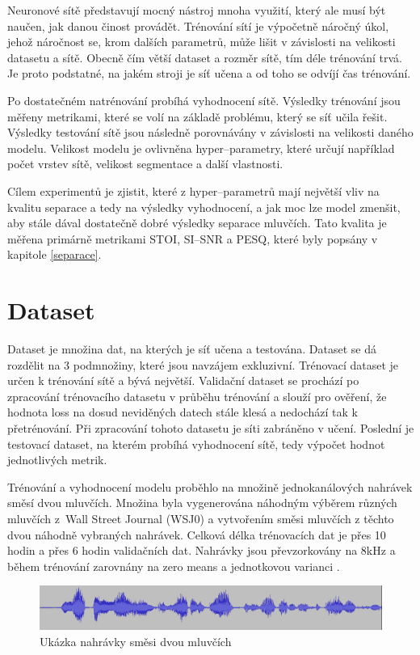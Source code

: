 Neuronové sítě představují mocný nástroj mnoha využití, který ale musí být naučen, jak danou činost provádět. Trénování sítí je výpočetně náročný úkol, jehož náročnost se, krom dalších parametrů, může lišit v závislosti na velikosti datasetu a sítě. Obecně čím větší dataset a rozměr sítě, tím déle trénování trvá. Je proto podstatné, na jakém stroji je síť učena a od toho se odvíjí čas trénování.

Po dostatečném natrénování probíhá vyhodnocení sítě. Výsledky trénování jsou měřeny metrikami, které se volí na základě problému, který se síť učila řešit. Výsledky testování sítě jsou následně porovnávány v závislosti na velikosti daného modelu. Velikost modelu je ovlivněna hyper--parametry, které určují například počet vrstev sítě, velikost segmentace a další vlastnosti.

Cílem experimentů je zjistit, které z hyper--parametrů mají největší vliv na kvalitu separace a tedy na výsledky vyhodnocení, a jak moc lze model zmenšit, aby stále dával dostatečně dobré výsledky separace mluvčích. Tato kvalita je měřena primárně metrikami STOI, SI--SNR a PESQ, které byly popsány v kapitole \ref{separace}.


\section{Dataset}
Dataset je množina dat, na kterých je síť učena a testována. Dataset se dá rozdělit na 3 podmnožiny, které jsou navzájem exkluzivní. Trénovací dataset je určen k trénování sítě a bývá největší. Validační dataset se prochází po zpracování trénovacího datasetu v průběhu trénování a slouží pro ověření, že hodnota loss na dosud neviděných datech stále klesá a nedochází tak k přetrénování. Při zpracování tohoto datasetu je síti zabráněno v učení. Poslední je testovací dataset, na kterém probíhá vyhodnocení sítě, tedy výpočet hodnot jednotlivých metrik. 

Trénování a vyhodnocení modelu proběhlo na množině jednokanálových nahrávek směsí dvou mluvčích. Množina byla vygenerována náhodným výběrem různých mluvčích z~Wall Street Journal (WSJ0) a vytvořením směsi mluvčích z těchto dvou náhodně vybraných nahrávek. Celková délka trénovacích dat je přes 10 hodin a přes 6 hodin validačních dat. Nahrávky jsou převzorkovány na 8kHz a během trénování zarovnány na zero means a jednotkovou varianci .

\begin{figure}[H]
    \centering
    \includegraphics[scale=0.35]{obrazky-figures/dataset-mix.png}
    \caption{\label{fig:ref-mixture}Ukázka nahrávky směsi dvou mluvčích}
\end{figure}

